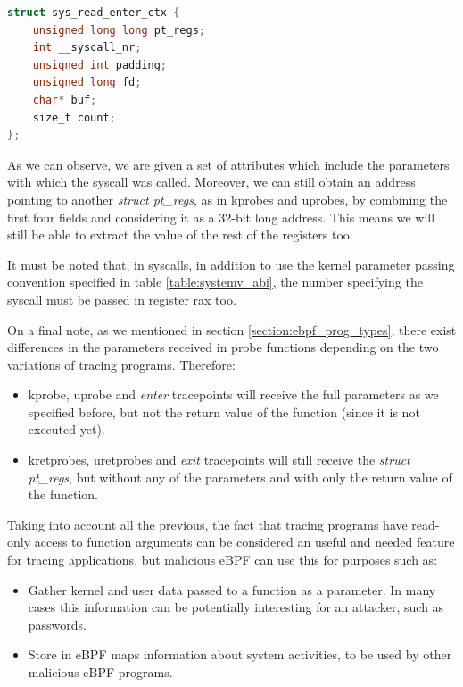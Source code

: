 \documentclass[12pt]{report} %
\begin{document}
\begin{lstlisting}[language=C, caption={Format of custom struct sys\_read\_enter\_ctx.}, label={code:sys_enter_read_tp}]
struct sys_read_enter_ctx {
    unsigned long long pt_regs;
    int __syscall_nr;
    unsigned int padding;
    unsigned long fd;
    char* buf;
    size_t count;
};
\end{lstlisting}

As we can observe, we are given a set of attributes which include the parameters with which the syscall was called. Moreover, we can still obtain an address pointing to another \textit{struct pt\_regs}, as in kprobes and uprobes, by combining the first four fields and considering it as a 32-bit long address. This means we will still be able to extract the value of the rest of the registers too. 

It must be noted that, in syscalls, in addition to use the kernel parameter passing convention specified in table \ref{table:systemv_abi}, the number specifying the syscall must be passed in register rax too.

On a final note, as we mentioned in section \ref{section:ebpf_prog_types}, there exist differences in the parameters received in probe functions depending on the two variations of tracing programs. Therefore:
\begin{itemize}
\item kprobe, uprobe and \textit{enter} tracepoints will receive the full parameters as we specified before, but not the return value of the function (since it is not executed yet).
\item kretprobes, uretprobes and \textit{exit} tracepoints will still receive the \textit{struct pt\_regs}, but without any of the parameters and with only the return value of the function.
\end{itemize}

Taking into account all the previous, the fact that tracing programs have read-only access to function arguments can be considered an useful and needed feature for tracing applications, but malicious eBPF can use this for purposes such as:
\begin{itemize}
\item Gather kernel and user data passed to a function as a parameter. In many cases this information can be potentially interesting for an attacker, such as passwords.
\item Store in eBPF maps information about system activities, to be used by other malicious eBPF programs.
\end{itemize}
\end{document}
